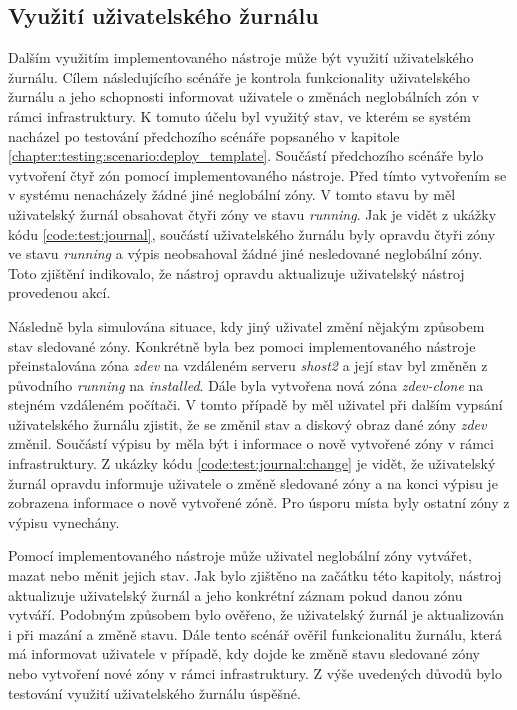 \subsection{Využití uživatelského žurnálu}
\label{chapter:testing:scenario:journal}
Dalším využitím implementovaného nástroje může být využití uživatelského žurnálu. Cílem následujícího scénáře je kontrola 
funkcionality uživatelského žurnálu a jeho schopnosti informovat uživatele o změnách neglobálních zón v rámci infrastruktury.
K tomuto účelu byl využitý stav, ve kterém se systém nacházel po testování předchozího scénáře popsaného v kapitole
\ref{chapter:testing:scenario:deploy_template}. Součástí předchozího scénáře bylo vytvoření čtyř zón pomocí implementovaného
nástroje. Před tímto vytvořením se v systému nenacházely žádné jiné neglobální zóny. V tomto stavu by měl uživatelský žurnál 
obsahovat čtyři zóny ve stavu \textit{running}. Jak je vidět z ukážky kódu \ref{code:test:journal}, součástí uživatelského
žurnálu byly opravdu čtyři zóny ve stavu \textit{running} a výpis neobsahoval žádné jiné nesledované neglobální zóny.
Toto zjištění indikovalo, že nástroj opravdu aktualizuje uživatelský nástroj provedenou akcí.

Následně byla simulována situace, kdy jiný uživatel změní nějakým způsobem stav sledované zóny. Konkrétně byla bez pomoci 
implementovaného nástroje přeinstalována zóna \textit{zdev} na vzdáleném serveru \textit{shost2} a její stav byl změněn z původního
\textit{running} na \textit{installed}. Dále byla vytvořena nová zóna \textit{zdev-clone} na stejném vzdáleném počítači. V tomto
případě by měl uživatel při dalším vypsání uživatelského žurnálu zjistit, že se změnil stav a diskový obraz dané zóny 
\textit{zdev} změnil. Součástí výpisu by měla být i informace o nově vytvořené zóny v rámci infrastruktury. Z ukázky kódu 
\ref{code:test:journal:change} je vidět, že uživatelský žurnál opravdu informuje uživatele o změně sledované zóny a na konci
výpisu je zobrazena informace o nově vytvořené zóně. Pro úsporu místa byly ostatní zóny z výpisu vynechány.


Pomocí implementovaného nástroje může uživatel neglobální zóny vytvářet, mazat nebo měnit jejich stav. Jak bylo zjištěno
na začátku této kapitoly, nástroj aktualizuje uživatelský žurnál a jeho konkrétní záznam pokud danou zónu vytváří. Podobným
způsobem bylo ověřeno, že uživatelský žurnál je aktualizován i při mazání a změně stavu. Dále tento scénář ověřil funkcionalitu
žurnálu, která má informovat uživatele v případě, kdy dojde ke změně stavu sledované zóny nebo vytvoření nové zóny v rámci
infrastruktury. Z výše uvedených důvodů bylo testování využití uživatelského žurnálu úspěšné.
